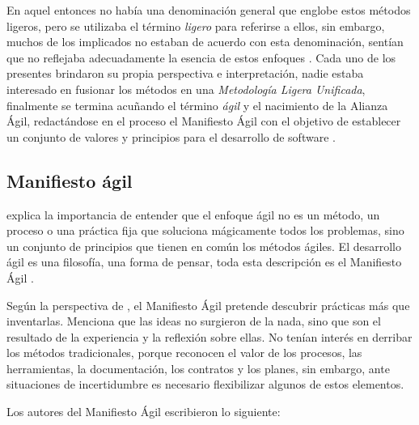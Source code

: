   En aquel entonces no había una denominación general que englobe estos métodos ligeros, pero se utilizaba el término \textit{ligero} para referirse a ellos, sin embargo, muchos de los implicados no estaban de acuerdo con esta denominación, sentían que no reflejaba adecuadamente la esencia de estos enfoques \cite{fowler:2005,cockburn:2002}. Cada uno de los presentes brindaron su propia perspectiva e interpretación, nadie estaba interesado en fusionar los métodos en una \textit{Metodología Ligera Unificada}, finalmente se termina acuñando el término \textit{ágil} y el nacimiento de la Alianza Ágil, redactándose en el proceso el Manifiesto Ágil con el objetivo de establecer un conjunto de valores y principios para el desarrollo de software \cite{cockburn:2002}.

  \subsection{Manifiesto ágil}
  \cite{verheyen:2019} explica la importancia de entender que el enfoque ágil no es un método, un proceso o una práctica fija que soluciona mágicamente todos los problemas, sino un conjunto de principios que tienen en común los métodos ágiles. El desarrollo ágil es una filosofía, una forma de pensar, toda esta descripción es el Manifiesto Ágil \cite{shore:2008}.

  Según la perspectiva de \cite{cockburn:2002}, el Manifiesto Ágil pretende descubrir prácticas más que inventarlas. Menciona que las ideas no surgieron de la nada, sino que son el resultado de la experiencia y la reflexión sobre ellas. No tenían interés en derribar los métodos tradicionales, porque reconocen el valor de los procesos, las herramientas, la documentación, los contratos y los planes, sin embargo, ante situaciones de incertidumbre es necesario flexibilizar algunos de estos elementos.

  Los autores del Manifiesto Ágil escribieron lo siguiente:

